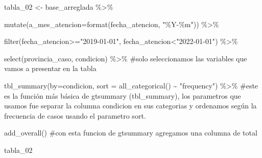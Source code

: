 \documentclass[
  letterpaper,
  DIV=11,
  numbers=noendperiod]{scrreprt}
\newenvironment{Shaded}{\begin{snugshade}}{\end{snugshade}}
\newcommand{\AttributeTok}[1]{\textcolor[rgb]{0.40,0.45,0.13}{#1}}
\newcommand{\CommentTok}[1]{\textcolor[rgb]{0.37,0.37,0.37}{#1}}
\newcommand{\FunctionTok}[1]{\textcolor[rgb]{0.28,0.35,0.67}{#1}}
\newcommand{\NormalTok}[1]{\textcolor[rgb]{0.00,0.23,0.31}{#1}}
\newcommand{\OtherTok}[1]{\textcolor[rgb]{0.00,0.23,0.31}{#1}}
\newcommand{\SpecialCharTok}[1]{\textcolor[rgb]{0.37,0.37,0.37}{#1}}
\newcommand{\StringTok}[1]{\textcolor[rgb]{0.13,0.47,0.30}{#1}}
\begin{document}
\begin{Shaded}
\begin{Highlighting}[]
\NormalTok{tabla\_02 }\OtherTok{\textless{}{-}}\NormalTok{ base\_arreglada }\SpecialCharTok{\%\textgreater{}\%}
  
  \FunctionTok{mutate}\NormalTok{(}\AttributeTok{a\_mes\_atencion=}\FunctionTok{format}\NormalTok{(fecha\_atencion, }\StringTok{"\%Y{-}\%m"}\NormalTok{)) }\SpecialCharTok{\%\textgreater{}\%} 
 
   \FunctionTok{filter}\NormalTok{(fecha\_atencion}\SpecialCharTok{\textgreater{}=}\StringTok{"2019{-}01{-}01"}\NormalTok{, fecha\_atencion}\SpecialCharTok{\textless{}}\StringTok{"2022{-}01{-}01"}\NormalTok{) }\SpecialCharTok{\%\textgreater{}\%} 
  
  \FunctionTok{select}\NormalTok{(provincia\_caso, condicion) }\SpecialCharTok{\%\textgreater{}\%} \CommentTok{\#solo seleccionamos las variables que vamos a presentar en la tabla}
  
  \FunctionTok{tbl\_summary}\NormalTok{(}\AttributeTok{by=}\NormalTok{condicion, }\AttributeTok{sort =} \FunctionTok{all\_categorical}\NormalTok{() }\SpecialCharTok{\textasciitilde{}} \StringTok{"frequency"}\NormalTok{) }\SpecialCharTok{\%\textgreater{}\%} \CommentTok{\#este es la función más básica de gtsummary (tbl\_summary), los parametros que usamos fue separar la columna condicion en sus categorias y ordenamos según la frecuencia de casos usando el parametro sort.}
  
  \FunctionTok{add\_overall}\NormalTok{() }\CommentTok{\#con esta funcion de gtsummary agregamos una columna de total}

\NormalTok{tabla\_02}
\end{Highlighting}
\end{Shaded}
\end{document}
